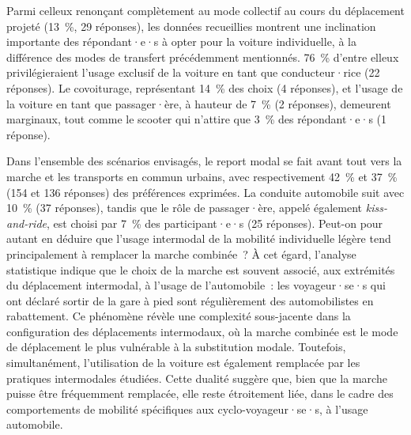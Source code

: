\begin{refsegment}
Parmi celleux renonçant complètement au mode collectif au cours du déplacement projeté (13~\%, 29 réponses), les données recueillies montrent une inclination importante des répondant·e·s à opter pour la voiture individuelle, à la différence des modes de transfert précédemment mentionnés. 76~\% d'entre elleux privilégieraient l'usage exclusif de la voiture en tant que conducteur·rice (22 réponses). Le covoiturage, représentant 14~\% des choix (4 réponses), et l'usage de la voiture en tant que passager·ère, à hauteur de 7~\% (2 réponses), demeurent marginaux, tout comme le scooter qui n'attire que 3~\% des répondant·e·s (1 réponse).%

Dans l'ensemble des scénarios envisagés, le report modal se fait avant tout vers la marche et les transports en commun urbains, avec respectivement 42~\% et 37~\% (154 et 136 réponses) des préférences exprimées. La conduite automobile suit avec 10~\% (37 réponses), tandis que le rôle de passager·ère, appelé également \textsl{kiss-and-ride}, est choisi par 7~\% des participant·e·s (25 réponses). Peut-on pour autant en déduire que l'usage intermodal de la mobilité individuelle légère tend principalement à remplacer la marche combinée~? À cet égard, l'analyse statistique indique que le choix de la marche est souvent associé, aux extrémités du déplacement intermodal, à l'usage de l'automobile~: les voyageur·se·s qui ont déclaré sortir de la gare à pied sont régulièrement des automobilistes en rabattement. Ce phénomène révèle une complexité sous-jacente dans la configuration des déplacements intermodaux, où la marche combinée est le mode de déplacement le plus vulnérable à la substitution modale. Toutefois, simultanément, l'utilisation de la voiture est également remplacée par les pratiques intermodales étudiées. Cette dualité suggère que, bien que la marche puisse être fréquemment remplacée, elle reste étroitement liée, dans le cadre des comportements de mobilité spécifiques aux cyclo-voyageur·se·s, à l'usage automobile.%


\end{refsegment}
